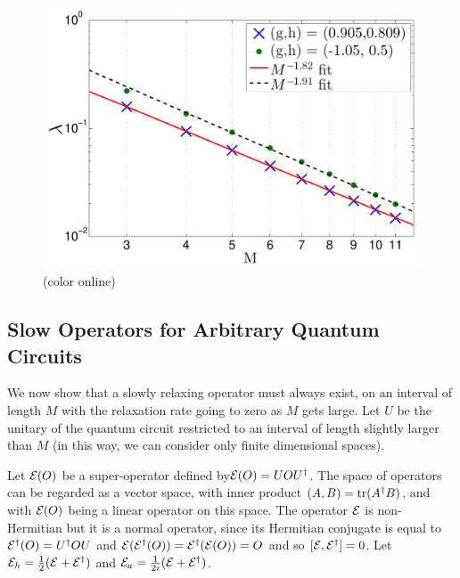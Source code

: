 \documentclass[twocolumn,superscriptaddress, prb]{revtex4-1}
\begin{document}
\begin{figure}
\includegraphics[width=1.0\linewidth]{semi_infinite_floquet_two_parameters_extended.pdf}
\centering
\caption{(color online) }
\label{fig:floquet_two_parameters}
\end{figure}

\subsection{Slow Operators for Arbitrary Quantum Circuits}
We now show that a slowly relaxing operator must always exist, on an interval of length $M$ with the relaxation rate going to zero as $M$ gets large.  Let $U$ be the unitary of the quantum circuit restricted to an interval of length slightly larger than $M$ (in this way, we can consider only finite dimensional spaces).

Let ${\cal E}(O)$ be a super-operator defined by${\cal E}(O)=UOU^\dagger$.  The space of operators can be regarded as a vector space, with inner product $(A,B)={\rm tr}(A^\dagger B)$, and with ${\cal E}(O)$ being a linear operator on this space.  The operator ${\cal E}$ is non-Hermitian but it is a normal operator, since its Hermitian conjugate is equal to ${\cal E}^\dagger(O)=U^\dagger O U$ and ${\cal E}({\cal E}^\dagger(O))={\cal E}^\dagger({\cal E}(O))=O$ and so $[{\cal E},{\cal E}^\dagger]=0$.  
Let ${\cal E}_h=\frac{1}{2}({\cal E}+{\cal E}^\dagger)$ and ${\cal E}_a=\frac{1}{2i}({\cal E}+{\cal E}^\dagger)$.
\end{document}
